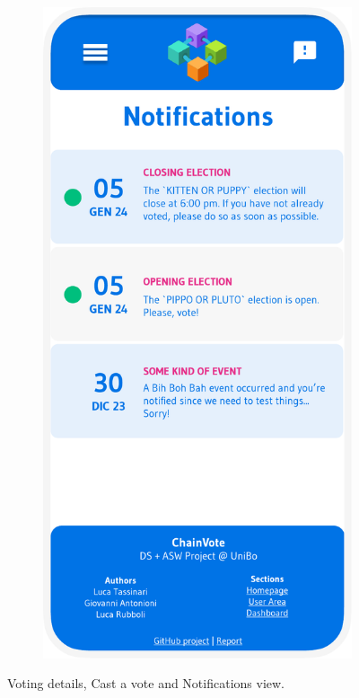 \documentclass{scrartcl}
\begin{document}
\begin{figure}[h]
\begin{subfigure}[b]{0.3\textwidth}
 \includegraphics[width=\textwidth]{./figures/mockups/notifications.pdf}
    \end{subfigure}
    \caption{Voting details, Cast a vote and Notifications view.}
    \label{fig:details-cast-notifications-view}
\end{figure}
\end{document}
